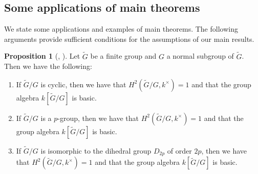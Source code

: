 \documentclass[pdftex,a4paper]{article}
\numberwithin{equation}{subsection}
\theoremstyle{definition}
\newtheorem{proposition}[theorem]{Proposition}
\begin{document}
\subsection{Some applications of main theorems}
We state some applications and examples of main theorems.
The following arguments provide sufficient conditions for the assumptions of our main results.
\begin{proposition}[{\cite[Lemma 3.5.4, Theorem 3.5.11]{MR998775}, \cite[Theorem 5.3, Theorem 5.9]{MR1200878}}]\label{assumption ex 2021-11-23 16:12:58}
	Let \(\tilde{G}\) be a finite group and \(G\) a normal subgroup of \(\tilde{G}\). Then we have the following:
	\begin{enumerate}
		\item If \(\tilde{G}/G\) is cyclic, then we have that \(H^2(\tilde{G}/G,k^{\times})=1\) and that the group algebra \(k[\tilde{G}/G]\) is basic.
		\item If \(\tilde{G}/G\) is a \(p\)-group, then we have that \(H^2(\tilde{G}/G,k^{\times})=1\) and that the group algebra \(k[\tilde{G}/G]\) is basic.
		\item If \(\tilde{G}/G\) is isomorphic to the dihedral group \(D_{2p}\) of order \(2p\), then we have that \(H^2(\tilde{G}/G,k^{\times})=1\) and that the group algebra \(k[\tilde{G}/G]\) is basic.
	\end{enumerate}
\end{proposition}
\end{document}
